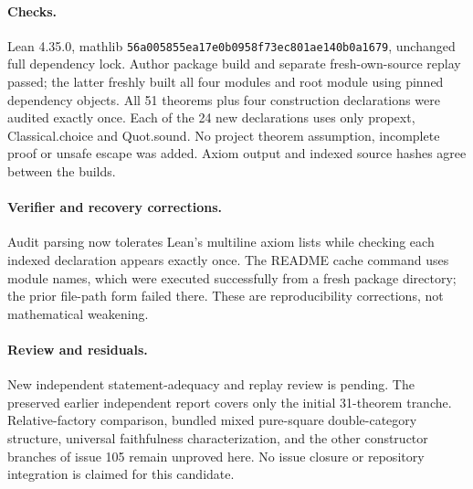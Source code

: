 \documentclass{article}
\begin{document}
\paragraph{Checks.} Lean 4.35.0, mathlib \texttt{56a005855ea17e0b0958f73ec801ae140b0a1679}, unchanged full dependency lock. Author package build and separate fresh-own-source replay passed; the latter freshly built all four modules and root module using pinned dependency objects. All 51 theorems plus four construction declarations were audited exactly once. Each of the 24 new declarations uses only propext, Classical.choice and Quot.sound. No project theorem assumption, incomplete proof or unsafe escape was added. Axiom output and indexed source hashes agree between the builds.
\paragraph{Verifier and recovery corrections.} Audit parsing now tolerates Lean's multiline axiom lists while checking each indexed declaration appears exactly once. The README cache command uses module names, which were executed successfully from a fresh package directory; the prior file-path form failed there. These are reproducibility corrections, not mathematical weakening.
\paragraph{Review and residuals.} New independent statement-adequacy and replay review is pending. The preserved earlier independent report covers only the initial 31-theorem tranche. Relative-factory comparison, bundled mixed pure-square double-category structure, universal faithfulness characterization, and the other constructor branches of issue 105 remain unproved here. No issue closure or repository integration is claimed for this candidate.
\end{document}
